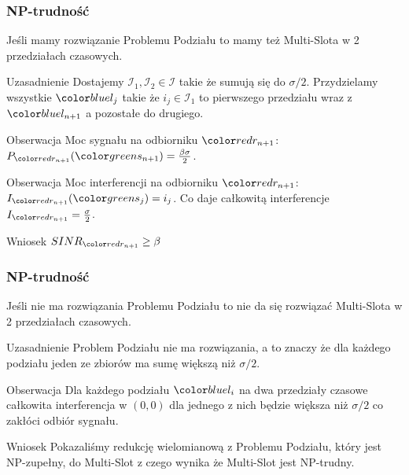 \documentclass[polish, t,10pt]{beamer}
\begin{document}
\begin{frame}
    \frametitle{NP-trudność}
    Jeśli mamy rozwiązanie Problemu Podziału to mamy też Multi-Slota w 2 przedziałach czasowych.
    \begin{block}{Uzasadnienie}
        Dostajemy $\mathcal{I}_1, \mathcal{I}_2 \in \mathcal{I}$ takie że sumują się do $\sigma/2$. Przydzielamy wszystkie $\lj$ takie że $i_j \in \mathcal{I}_1$ to pierwszego przedziału wraz z $\lno$ a pozostałe do drugiego.
    \end{block}
    \pause
    \begin{block}{Obserwacja}
        Moc sygnału na odbiorniku $\rno$: $P_\rno(\sno) = \frac{\beta\sigma}{2}$.
    \end{block}
    \pause
    \begin{block}{Obserwacja}
        Moc interferencji na odbiorniku $\rno$: $I_\rno(\sj) = i_j$. Co daje całkowitą interferencje $I_\rno = \frac{\sigma}{2}$.
    \end{block}
    \pause
    \begin{block}{Wniosek}
        $SINR_\rno \geq \beta$
    \end{block}
\end{frame}
\begin{frame}
    \frametitle{NP-trudność}
    Jeśli nie ma rozwiązania Problemu Podziału to nie da się rozwiązać Multi-Slota w 2 przedziałach czasowych.
    \begin{block}{Uzasadnienie}
        Problem Podziału nie ma rozwiązania, a to znaczy że dla każdego podziału jeden ze zbiorów ma sumę większą niż $\sigma/2$.
    \end{block}
    \pause
    \begin{block}{Obserwacja}
        Dla każdego podziału $\li$ na dwa przedziały czasowe całkowita interferencja w $(0, 0)$ dla jednego z nich będzie większa niż $\sigma/2$ co zakłóci odbiór sygnału.
    \end{block}
    \pause
    \begin{block}{Wniosek}
        Pokazaliśmy redukcję wielomianową z Problemu Podziału, który jest NP-zupełny, do Multi-Slot z czego wynika że Multi-Slot jest NP-trudny.
    \end{block}
\end{frame}
\end{document}
